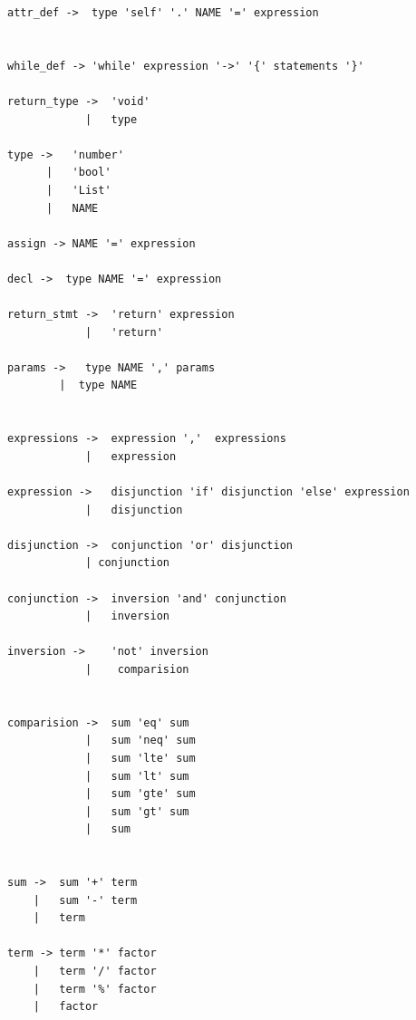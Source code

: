 \begin{verbatim}
attr_def ->  type 'self' '.' NAME '=' expression           


while_def -> 'while' expression '->' '{' statements '}'              

return_type ->  'void'                        
            |   type                          

type ->   'number'        
      |   'bool'          
      |   'List'          
      |   NAME            

assign -> NAME '=' expression                         

decl ->  type NAME '=' expression                              

return_stmt ->  'return' expression                                      
            |   'return'                                        

params ->   type NAME ',' params      
        |  type NAME                  


expressions ->  expression ','  expressions               
            |   expression                                

expression ->   disjunction 'if' disjunction 'else' expression            
            |   disjunction                                                

disjunction ->  conjunction 'or' disjunction                                
            | conjunction                                                   

conjunction ->  inversion 'and' conjunction                                 
            |   inversion                                                   

inversion ->    'not' inversion                                             
            |    comparision                                                


comparision ->  sum 'eq' sum                       
            |   sum 'neq' sum                      
            |   sum 'lte' sum                      
            |   sum 'lt' sum                       
            |   sum 'gte' sum                      
            |   sum 'gt' sum                       
            |   sum


sum ->  sum '+' term                            
    |   sum '-' term                            
    |   term 

term -> term '*' factor                         
    |   term '/' factor                         
    |   term '%' factor                         
    |   factor


\end{verbatim}
